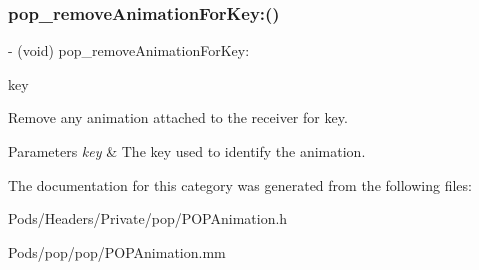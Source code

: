 \subsubsection{\texorpdfstring{pop\+\_\+remove\+Animation\+For\+Key\+:()}{pop\_removeAnimationForKey:()}\hspace{0.1cm}{\footnotesize\ttfamily [3/3]}}
{\footnotesize\ttfamily -\/ (void) pop\+\_\+remove\+Animation\+For\+Key\+: \begin{DoxyParamCaption}\item[{(N\+S\+String $\ast$)}]{key }\end{DoxyParamCaption}}

Remove any animation attached to the receiver for \textquotesingle{}key\textquotesingle{}. 
\begin{DoxyParams}{Parameters}
{\em key} & The key used to identify the animation. \\
\hline
\end{DoxyParams}


The documentation for this category was generated from the following files\+:\begin{DoxyCompactItemize}
\item 
Pods/\+Headers/\+Private/pop/P\+O\+P\+Animation.\+h\item 
Pods/pop/pop/P\+O\+P\+Animation.\+mm\end{DoxyCompactItemize}
